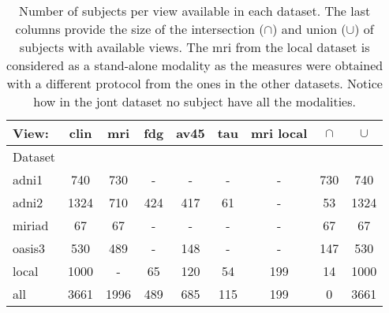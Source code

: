 \begin{table*}[!t]
\caption{
Number of subjects per view available in each dataset.
The last columns provide the size of the intersection ($\cap$) and union ($\cup$) of subjects with available views.
The mri from the local dataset is considered as a stand-alone modality as the measures were obtained with a different protocol from the ones in the other datasets.
Notice how in the jont dataset no subject have all the modalities.
}
\centering
\begin{tabular}{lcccccc|cc}
\toprule
View: &    clin &   mri &  fdg & av45 &  tau & mri local & $\cap$ & $\cup$ \\
\midrule
Dataset \\
adni1   &   740 &   730 &    - &    - &    - &          - & 730 &  740 \\
adni2   &  1324 &   710 &  424 &  417 &   61 &          - &  53 & 1324 \\
miriad  &    67 &    67 &    - &    - &    - &          - &  67 &   67 \\
oasis3  &   530 &   489 &    - &  148 &    - &          - & 147 &  530 \\
local   &  1000 &     - &   65 &  120 &   54 &        199 &  14 & 1000 \\
\midrule
all     &  3661 &  1996 &  489 &  685 &  115 &        199 &   0 & 3661 \\
\bottomrule
\end{tabular}
\label{table:datasets}
\end{table*}
